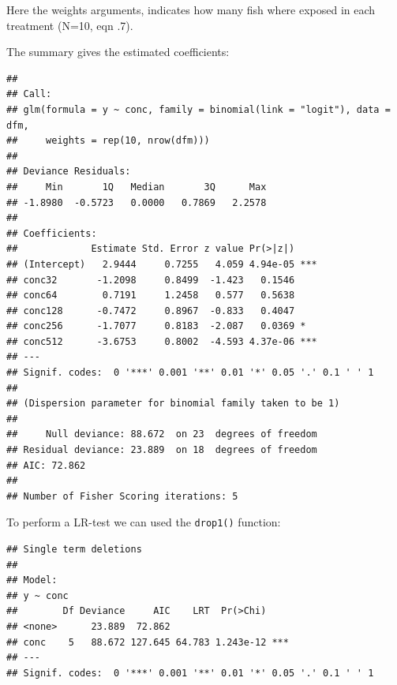 Here the weights arguments, indicates how many fish where exposed in each treatment (N=10, eqn .7).

The summary gives the estimated coefficients:
\begin{knitrout}
\color{fgcolor}\begin{kframe}
\begin{alltt}
\end{alltt}
\begin{verbatim}
## 
## Call:
## glm(formula = y ~ conc, family = binomial(link = "logit"), data = dfm, 
##     weights = rep(10, nrow(dfm)))
## 
## Deviance Residuals: 
##     Min       1Q   Median       3Q      Max  
## -1.8980  -0.5723   0.0000   0.7869   2.2578  
## 
## Coefficients:
##             Estimate Std. Error z value Pr(>|z|)    
## (Intercept)   2.9444     0.7255   4.059 4.94e-05 ***
## conc32       -1.2098     0.8499  -1.423   0.1546    
## conc64        0.7191     1.2458   0.577   0.5638    
## conc128      -0.7472     0.8967  -0.833   0.4047    
## conc256      -1.7077     0.8183  -2.087   0.0369 *  
## conc512      -3.6753     0.8002  -4.593 4.37e-06 ***
## ---
## Signif. codes:  0 '***' 0.001 '**' 0.01 '*' 0.05 '.' 0.1 ' ' 1
## 
## (Dispersion parameter for binomial family taken to be 1)
## 
##     Null deviance: 88.672  on 23  degrees of freedom
## Residual deviance: 23.889  on 18  degrees of freedom
## AIC: 72.862
## 
## Number of Fisher Scoring iterations: 5
\end{verbatim}
\end{kframe}
\end{knitrout}

To perform a LR-test we can used the \texttt{drop1()} function:
\begin{knitrout}
\color{fgcolor}\begin{kframe}
\begin{alltt}
  \hlstd{=} \hlstd{)}
\end{alltt}
\begin{verbatim}
## Single term deletions
## 
## Model:
## y ~ conc
##        Df Deviance     AIC    LRT  Pr(>Chi)    
## <none>      23.889  72.862                     
## conc    5   88.672 127.645 64.783 1.243e-12 ***
## ---
## Signif. codes:  0 '***' 0.001 '**' 0.01 '*' 0.05 '.' 0.1 ' ' 1
\end{verbatim}
\end{kframe}
\end{knitrout}

